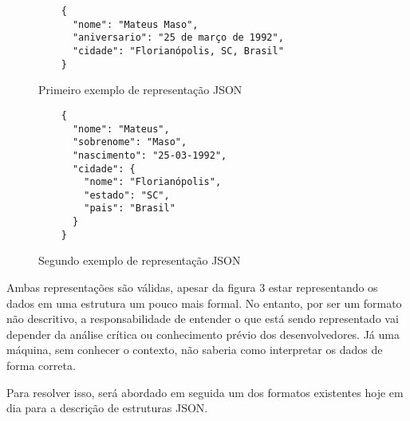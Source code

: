 \begin{figure}[H]
  \centering
  \begin{verbatim}
    {
      "nome": "Mateus Maso",
      "aniversario": "25 de março de 1992",
      "cidade": "Florianópolis, SC, Brasil"
    }
  \end{verbatim}
  \caption{Primeiro exemplo de representação JSON}
\end{figure}

\begin{figure}[H]
  \centering
  \begin{verbatim}
    {
      "nome": "Mateus",
      "sobrenome": "Maso",
      "nascimento": "25-03-1992",
      "cidade": {
        "nome": "Florianópolis",
        "estado": "SC",
        "pais": "Brasil"
      }
    }
  \end{verbatim}
  \caption{Segundo exemplo de representação JSON}
\end{figure}

Ambas representações são válidas, apesar da figura 3 estar representando os dados em uma estrutura um pouco mais formal. No entanto, por ser um formato não descritivo, a responsabilidade de entender o que está sendo representado vai depender da análise crítica ou conhecimento prévio dos desenvolvedores. Já uma máquina, sem conhecer o contexto, não saberia como interpretar os dados de forma correta. \cite{Droettboom2015}

Para resolver isso, será abordado em seguida um dos formatos existentes hoje em dia para a descrição de estruturas JSON.
